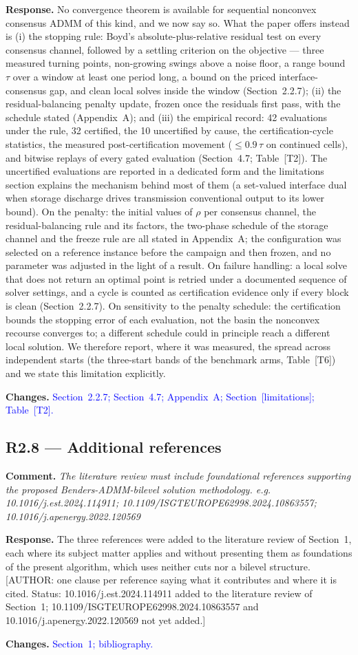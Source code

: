 \documentclass[11pt]{article}
\newcommand{\rcomment}[1]{\par\medskip\noindent\textbf{Comment.} \textit{#1}\par\smallskip}
\newcommand{\rresponse}[1]{\noindent\textbf{Response.} #1\par\smallskip}
\newcommand{\rchanges}[1]{\noindent\textbf{Changes.} \textcolor{blue}{#1}\par\medskip}
\begin{document}
\rresponse{No convergence theorem is available for sequential nonconvex consensus ADMM of this kind, and we
now say so. What the paper offers instead is (i) the stopping rule: Boyd's absolute-plus-relative
residual test on every consensus channel, followed by a settling criterion on the objective --- three
measured turning points, non-growing swings above a noise floor, a range bound $\tau$ over a window at
least one period long, a bound on the priced interface-consensus gap, and clean local solves inside the
window (Section~2.2.7); (ii) the residual-balancing penalty update, frozen once the residuals first pass,
with the schedule stated (Appendix~A); and (iii) the empirical record: 42 evaluations under the rule, 32
certified, the 10 uncertified by cause, the certification-cycle statistics, the measured
post-certification movement ($\le 0.9\,\tau$ on continued cells), and bitwise replays of every gated
evaluation (Section~4.7; Table~[T2]). The uncertified evaluations are reported in a dedicated form and
the limitations section explains the mechanism behind most of them (a set-valued interface dual when
storage discharge drives transmission conventional output to its lower bound). On the penalty: the
initial values of $\rho$ per consensus channel, the residual-balancing rule and its factors, the two-phase
schedule of the storage channel and the freeze rule are all stated in Appendix~A; the configuration was
selected on a reference instance before the campaign and then frozen, and no parameter was adjusted in
the light of a result. On failure handling: a local solve that does not return an optimal point is retried
under a documented sequence of solver settings, and a cycle is counted as certification evidence only if
every block is clean (Section~2.2.7). On sensitivity to the penalty schedule: the certification bounds the
stopping error of each evaluation, not the basin the nonconvex recourse converges to; a different
schedule could in principle reach a different local solution. We therefore report, where it was measured,
the spread across independent starts (the three-start bands of the benchmark arms, Table~[T6]) and we
state this limitation explicitly.}
\rchanges{Section~2.2.7; Section~4.7; Appendix~A; Section~[limitations]; Table~[T2].}

\subsection*{R2.8 --- Additional references}
\rcomment{The literature review must include foundational references supporting the proposed Benders-ADMM-bilevel solution methodology. e.g. 10.1016/j.est.2024.114911; 10.1109/ISGTEUROPE62998.2024.10863557; 10.1016/j.apenergy.2022.120569}
\rresponse{The three references were added to the literature review of Section~1, each where its subject
matter applies and without presenting them as foundations of the present algorithm, which uses neither
cuts nor a bilevel structure. [AUTHOR: one clause per reference saying what it contributes and where it is
cited. Status: 10.1016/j.est.2024.114911 added to the literature review of Section~1;
10.1109/ISGTEUROPE62998.2024.10863557 and 10.1016/j.apenergy.2022.120569 not yet added.]}
\rchanges{Section~1; bibliography.}
\end{document}
